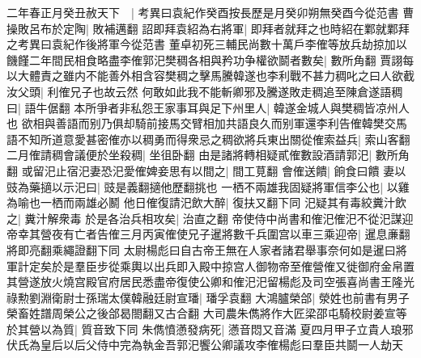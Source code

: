 二年春正月癸丑赦天下　|{
	考異曰袁紀作癸酉按長歷是月癸卯朔無癸酉今從范書}
曹操敗呂布於定陶|{
	敗補邁翻}
詔即拜袁紹為右將軍|{
	即拜者就拜之也時紹在鄴就鄴拜之考異曰袁紀作後將軍今從范書}
董卓初死三輔民尚數十萬戶李傕等放兵劫掠加以饑饉二年間民相食略盡李傕郭汜樊稠各相與矜功争權欲鬬者數矣|{
	數所角翻}
賈詡每以大體責之雖内不能善外相含容樊稠之擊馬騰韓遂也李利戰不甚力稠叱之曰人欲截汝父頭|{
	利傕兄子也故云然}
何敢如此我不能斬卿邪及騰遂敗走稠追至陳倉遂語稠曰|{
	語牛倨翻}
本所爭者非私怨王家事耳與足下州里人|{
	韓遂金城人與樊稠皆凉州人也}
欲相與善語而别乃俱却騎前接馬交臂相加共語良久而别軍還李利告傕韓樊交馬語不知所道意愛甚密傕亦以稠勇而得衆忌之稠欲將兵東出關從傕索益兵|{
	索山客翻}
二月傕請稠會議便於坐殺稠|{
	坐徂卧翻}
由是諸將轉相疑貳傕數設酒請郭汜|{
	數所角翻}
或留汜止宿汜妻恐汜愛傕婢妾思有以間之|{
	間工莧翻}
會傕送饋|{
	餉食曰饋}
妻以豉為藥擿以示汜曰|{
	豉是義翻擿他歷翻挑也}
一栖不兩雄我固疑將軍信李公也|{
	以雞為喻也一栖而兩雄必鬭}
他日傕復請汜飲大醉|{
	復扶又翻下同}
汜疑其有毒絞糞汁飲之|{
	糞汁解衆毒}
於是各治兵相攻矣|{
	治直之翻}
帝使侍中尚書和傕汜傕汜不從汜謀迎帝幸其營夜有亡者告傕三月丙寅傕使兄子暹將數千兵圍宫以車三乘迎帝|{
	暹息亷翻將即亮翻乘繩證翻下同}
太尉楊彪曰自古帝王無在人家者諸君舉事奈何如是暹曰將軍計定矣於是羣臣步從乘輿以出兵即入殿中掠宫人御物帝至傕營傕又徙御府金帛置其營遂放火燒宫殿官府居民悉盡帝復使公卿和傕汜汜留楊彪及司空張喜尚書王隆光祿勲劉淵衛尉士孫瑞太僕韓融廷尉宣璠|{
	璠孚袁翻}
大鴻臚榮郃|{
	滎姓也前書有男子榮畜姓譜周榮公之後郃曷閤翻又古合翻}
大司農朱儁將作大匠梁邵屯騎校尉姜宣等於其營以為質|{
	質音致下同}
朱儁憤懣發病死|{
	懣音悶又音滿}
夏四月甲子立貴人琅邪伏氏為皇后以后父侍中完為執金吾郭汜饗公卿議攻李傕楊彪曰羣臣共鬬一人劫天

